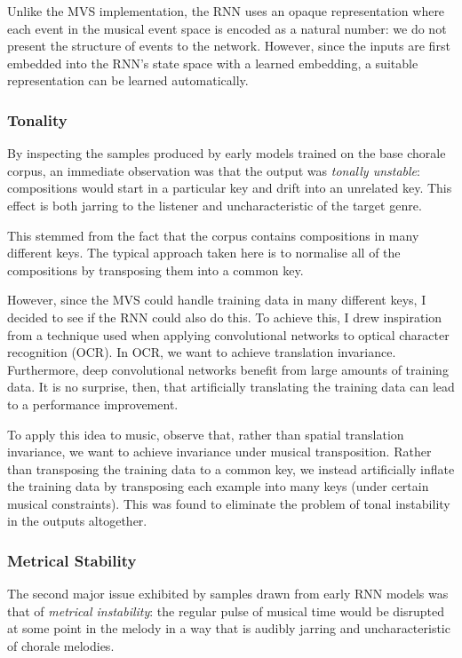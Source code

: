 \documentclass[12pt,a4paper,twoside,openright]{report}
\begin{document}
Unlike the MVS implementation, the RNN uses an opaque representation where each
event in the musical event space is encoded as a natural number: we do not
present the structure of events to the network. However, since the inputs are
first embedded into the RNN's state space with a learned embedding, a suitable
representation can be learned automatically.

\subsubsection{Tonality}

By inspecting the samples produced by early models trained on the base chorale
corpus, an immediate observation was that the output was \emph{tonally
unstable}: compositions would start in a particular key and drift into an
unrelated key. This effect is both jarring to the listener and uncharacteristic
of the target genre.

This stemmed from the fact that the corpus contains compositions in many
different keys. The typical approach taken here is to normalise all of the
compositions by transposing them into a common key.

However, since the MVS could handle training data in many different keys, I
decided to see if the RNN could also do this. To achieve this, I drew
inspiration from a technique used when applying convolutional networks to
optical character recognition (OCR). In OCR, we want to achieve translation
invariance. Furthermore, deep convolutional networks benefit from large amounts
of training data. It is no surprise, then, that artificially translating the
training data can lead to a performance improvement.

To apply this idea to music, observe that, rather than spatial translation
invariance, we want to achieve invariance under musical transposition. Rather
than transposing the training data to a common key, we instead artificially
inflate the training data by transposing each example into many keys (under
certain musical constraints). This was found to eliminate the problem of tonal
instability in the outputs altogether.

\subsubsection{Metrical Stability}

The second major issue exhibited by samples drawn from early RNN models was that
of \emph{metrical instability}: the regular pulse of musical time would be
disrupted at some point in the melody in a way that is audibly jarring and
uncharacteristic of chorale melodies.
\end{document}
